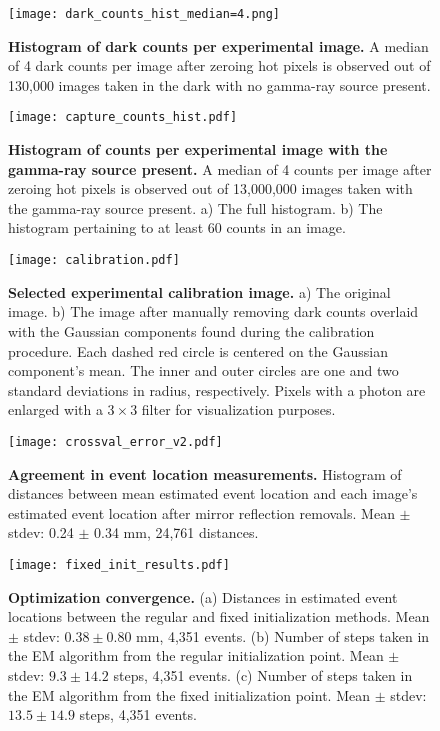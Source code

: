 \documentclass{article}
\begin{document}
\begin{figure}
\centering
\texttt{[image: dark\_counts\_hist\_median=4.png]}
\caption{\textbf{Histogram of dark counts per experimental image.} 
A median of 4 dark counts per image after zeroing hot pixels is observed out of 
130,000 images taken in the dark with no gamma-ray source present.} 
\label{fig:dark_counts_hist}
\end{figure}


\begin{figure}
\centering
\texttt{[image: capture\_counts\_hist.pdf]}
\caption{\textbf{Histogram of counts per experimental image with the gamma-ray source present.} A median of 4 counts 
per image after zeroing hot pixels is observed out of 13,000,000 images taken with 
the gamma-ray source present. 
a) The full histogram. 
b) The histogram pertaining to at least 60 counts in an image.} 
\label{fig:cap_counts_hist}
\end{figure}


\begin{figure*}
\centering
\texttt{[image: calibration.pdf]}
\caption{\textbf{Selected experimental calibration image.} a) The original image. b) The image after manually 
removing dark counts overlaid with the Gaussian components found during the 
calibration procedure.
Each dashed red circle is centered on the Gaussian component's mean. 
The inner and outer circles are one and two standard deviations in radius, respectively.
Pixels with a photon are enlarged with a $3 \times 3$ filter for visualization purposes.
} 
\label{fig:calibration}
\end{figure*}


\begin{figure}
\centering
\texttt{[image: crossval\_error\_v2.pdf]}
\caption{\textbf{Agreement in event location measurements.} Histogram of distances 
between mean estimated event location and each image's estimated event location 
after mirror reflection removals. Mean $\pm$ stdev: 0.24 $\pm$ 0.34 mm, 24,761 distances.
} 
\label{fig:crossval_error}
\end{figure}


\begin{figure*}
\centering
\texttt{[image: fixed\_init\_results.pdf]}
\caption{\textbf{Optimization convergence.}
(a) Distances in estimated event locations between the regular and fixed initialization methods. Mean $\pm$ stdev: $0.38 \pm 0.80$ mm, 4,351 events.
(b) Number of steps taken in the EM algorithm from the regular initialization point. Mean $\pm$ stdev: $9.3 \pm 14.2$ steps, 4,351 events.
(c) Number of steps taken in the EM algorithm from the fixed initialization point. Mean $\pm$ stdev: $13.5 \pm 14.9$ steps, 4,351 events.
} 
\label{fig:convergence}
\end{figure*}
\end{document}
